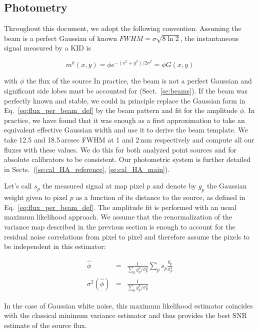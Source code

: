 \subsection{Photometry}
\label{se:intro_photometry}

Throughout this document, we adopt the following convention. Assuming the beam
is a perfect Gaussian of known $FWHM=\sigma\sqrt{8\ln 2}$, the instantaneous
signal measured by a KID is

\begin{equation}
m^k(x,y) = \phi e^{-(x^2+y^2)/2\sigma^2} = \phi G(x,y)
\label{eq:flux_per_beam_def}
\end{equation}

with $\phi$ the flux of the source  In practice, the beam is not a perfect Gaussian
and significant side lobes must be accounted for
(Sect.~\ref{se:beams}). If the beam was perfectly known and stable, we could in
principle replace the Gaussian form in Eq.~\ref{eq:flux_per_beam_def} by the
beam pattern and fit for the amplitude $\phi$. In practice, we have found that
it was enough as a first approximation to take an equivalent effective Gaussian
width and use it to derive the beam template. We take 12.5 and 18.5\,arcsec FWHM
at 1 and 2\,mm respectively and compute all our fluxes with these
values. We do this for both analyzed point sources and for absolute calibrators
to be consistent. Our photometric system is further detailed in
Sects.~(\ref{se:cal_HA_reference}, \ref{se:cal_HA_main}). 

Let's call $s_p$ the measured signal at map pixel $p$ and denote by $g_p$ the
Gaussian weight given to pixel $p$ as a function of its distance to the source,
as defined in Eq.~\ref{eq:flux_per_beam_def}. The amplitude fit is performed
with an usual maximum likelihood approach. We assume that the renormalization of
the variance map described in the previous section is enough to account for the
residual noise correlations from pixel to pixel and therefore assume the pixels to
be independent in this estimator:

\begin{eqnarray}
\hat{\phi} &=& \frac{1}{\sum_p g_p^2/\sigma_p^2}\sum_p
s_p\frac{g_p}{\sigma_p^2} \label{eq:flux_estim_def} \\
\sigma^2(\hat{\phi}) &=& \frac{1}{\sum_p
  g_p^2/\sigma_p^2} \label{eq:flux_estim_var_def}
\end{eqnarray}

In the case of Gaussian white noise, this maximum likelihood estimator coincides
with the classical minimum variance estimator and thus provides the best SNR
estimate of the source flux.

